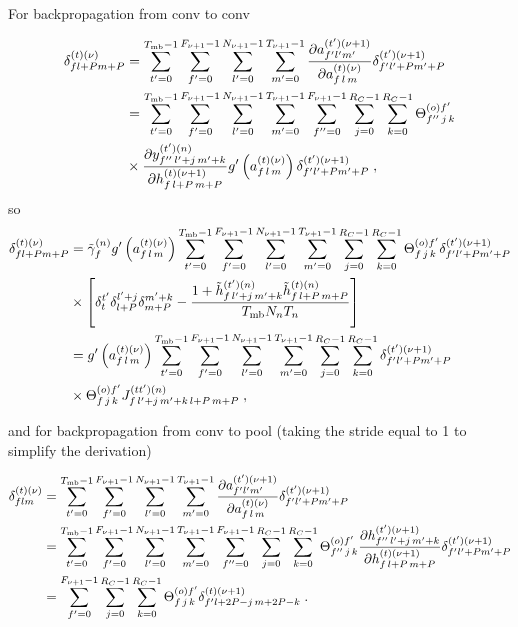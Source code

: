 \begin{subappendices}
For backpropagation from conv to conv

\begin{align}
\delta^{(t)(\nu)}_{fl+Pm+P}&=
%
\sum_{t'=0}^{T_{{\rm mb}}-1}\sum^{F_{\nu+1}-1}_{f'=0}\sum^{N_{\nu+1}-1}_{l'=0}\sum^{T_{\nu+1}-1}_{m'=0}
%
\frac{\partial a_{f'l'm'}^{(t')(\nu+1)}}{\partial a_{f\,l\,m}^{(t)(\nu)}}
%
\delta_{f'l'+Pm'+P}^{(t')(\nu+1)}\notag\\
%
&=\sum_{t'=0}^{T_{{\rm mb}}-1}\sum^{F_{\nu+1}-1}_{f'=0}\sum^{N_{\nu+1}-1}_{l'=0}\sum^{T_{\nu+1}-1}_{m'=0}
%
\sum^{F_{\nu+1}-1}_{f''=0}\sum^{R_C-1}_{j=0}\sum^{R_C-1}_{k=0}
%
\Theta^{(o)f'}_{f''\,j\,k}\notag\\
%
&\times\frac{\partial  y^{(t')(n)}_{f''\,l'+j\,m'+k}}{\partial h_{f\,l+P\,m+P}^{(t)(\nu+1)}}
%
g'\left(a_{f\,l\,m}^{(t)(\nu)}\right)\delta_{f'l'+Pm'+P}^{(t')(\nu+1)}\;,
\end{align}
so
\begin{align}
\delta^{(t)(\nu)}_{fl+Pm+P}&=\tilde{\gamma}^{(n)}_fg'\left(a_{f\,l\,m}^{(t)(\nu)}\right)
%
\sum_{t'=0}^{T_{{\rm mb}}-1}\sum^{F_{\nu+1}-1}_{f'=0}\sum^{N_{\nu+1}-1}_{l'=0}\sum^{T_{\nu+1}-1}_{m'=0}
%
\sum^{R_C-1}_{j=0}\sum^{R_C-1}_{k=0}\Theta^{(o)f'}_{f\,j\,k}\delta_{f'l'+Pm'+P}^{(t')(\nu+1)}\notag\\
%
&\times \left[\delta^{t'}_t\delta^{ l'+j}_{l+P}\delta^{m'+k}_{m+P}-
%
\frac{1+\tilde{h}_{f\, l'+j\,m'+k}^{(t')(n)}\tilde{h}_{f\,l+P\,m+P}^{(t)(n)}}{T_{{\rm mb}}N_nT_n}\right]\notag\\
%
&=g'\left(a_{f\,l\,m}^{(t)(\nu)}\right)
%
\sum_{t'=0}^{T_{{\rm mb}}-1}\sum^{F_{\nu+1}-1}_{f'=0}\sum^{N_{\nu+1}-1}_{l'=0}\sum^{T_{\nu+1}-1}_{m'=0}
%
\sum^{R_C-1}_{j=0}\sum^{R_C-1}_{k=0}\delta_{f'l'+Pm'+P}^{(t')(\nu+1)}\notag\\
%
&\times \Theta^{(o)f'}_{f\,j\,k} J^{(tt')(n)}_{f\, l'+j\,m'+k\,l+P\,m+P}\;,
\end{align}

and for backpropagation from conv to pool (taking the stride equal to 1 to simplify the derivation)

\begin{align}
\delta^{(t)(\nu)}_{flm}&=
%
\sum_{t'=0}^{T_{{\rm mb}}-1}\sum^{F_{\nu+1}-1}_{f'=0}\sum^{N_{\nu+1}-1}_{l'=0}\sum^{T_{\nu+1}-1}_{m'=0}
%
\frac{\partial a_{f'l'm'}^{(t')(\nu+1)}}{\partial a_{f\,l\,m}^{(t)(\nu)}}
%
\delta_{f'l'+Pm'+P}^{(t')(\nu+1)}\notag\\
%
&=\sum_{t'=0}^{T_{{\rm mb}}-1}\sum^{F_{\nu+1}-1}_{f'=0}\sum^{N_{\nu+1}-1}_{l'=0}\sum^{T_{\nu+1}-1}_{m'=0}
%
\sum^{F_{\nu+1}-1}_{f''=0}\sum^{R_C-1}_{j=0}\sum^{R_C-1}_{k=0}
%
\Theta^{(o)f'}_{f''\,j\,k}
%
\frac{\partial  h^{(t')(\nu+1)}_{f''\,l'+j\,m'+k}}{\partial h_{f\,l+P\,m+P}^{(t)(\nu+1)}}
%
\delta_{f'l'+Pm'+P}^{(t')(\nu+1)}\notag\\
%
&=\sum^{F_{\nu+1}-1}_{f'=0}\sum^{R_C-1}_{j=0}\sum^{R_C-1}_{k=0}
%
\Theta^{(o)f'}_{f\,j\,k}\delta_{f'l+2P-j\,m+2P-k}^{(t)(\nu+1)}\;.
\end{align}


\end{subappendices}

